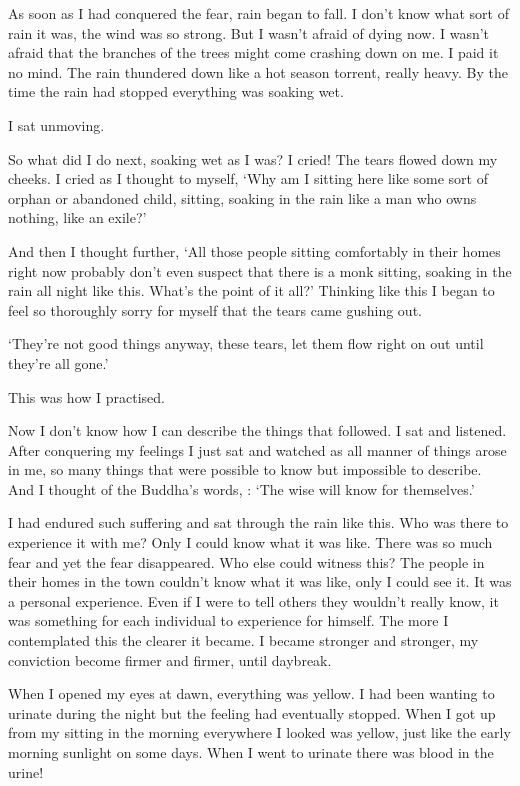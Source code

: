As soon as I had conquered the fear, rain began to fall. I don't know what sort of rain it was, the wind was so strong. But I wasn't afraid of dying now. I wasn't afraid that the branches of the trees might come crashing down on me. I paid it no mind. The rain thundered down like a hot season torrent, really heavy. By the time the rain had stopped everything was soaking wet.

I sat unmoving.

So what did I do next, soaking wet as I was? I cried! The tears flowed down my cheeks. I cried as I thought to myself, `Why am I sitting here like some sort of orphan or abandoned child, sitting, soaking in the rain like a man who owns nothing, like an exile?'

And then I thought further, `All those people sitting comfortably in their homes right now probably don't even suspect that there is a monk sitting, soaking in the rain all night like this. What's the point of it all?' Thinking like this I began to feel so thoroughly sorry for myself that the tears came gushing out.

`They're not good things anyway, these tears, let them flow right on out until they're all gone.'

This was how I practised.

Now I don't know how I can describe the things that followed. I sat and listened. After conquering my feelings I just sat and watched as all manner of things arose in me, so many things that were possible to know but impossible to describe. And I thought of the Buddha's words, : `The wise will know for themselves.'

I had endured such suffering and sat through the rain like this. Who was there to experience it with me? Only I could know what it was like. There was so much fear and yet the fear disappeared. Who else could witness this? The people in their homes in the town couldn't know what it was like, only I could see it. It was a personal experience. Even if I were to tell others they wouldn't really know, it was something for each individual to experience for himself. The more I contemplated this the clearer it became. I became stronger and stronger, my conviction become firmer and firmer, until daybreak.

When I opened my eyes at dawn, everything was yellow. I had been wanting to urinate during the night but the feeling had eventually stopped. When I got up from my sitting in the morning everywhere I looked was yellow, just like the early morning sunlight on some days. When I went to urinate there was blood in the urine!

